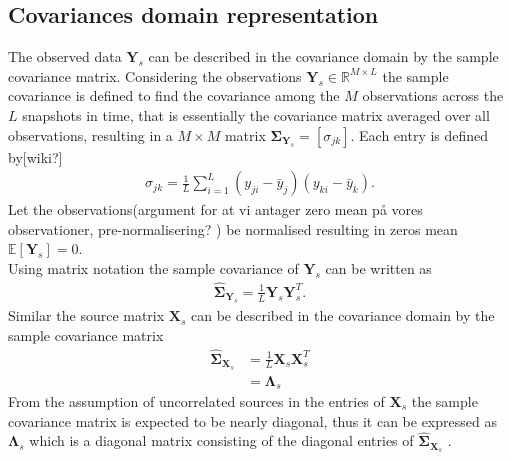 \subsection{Covariances domain representation}
The observed data $\mathbf{Y}_s$ can be described in the covariance domain by the sample covariance matrix. Considering the observations $\mathbf{Y}_s \in \mathbb{R}^{M\times L}$ the sample covariance is defined to find the covariance among the $M$ observations across the $L$ snapshots in time, that is essentially the covariance matrix averaged over all observations, resulting in a $M \times M$ matrix $\boldsymbol{\Sigma}_{\mathbf{Y}_s}=[\sigma_{jk}]$. Each entry is defined by[wiki?] 
\begin{align*}
\sigma_{jk}= \frac{1}{L}\sum_{i=1}^{L}(y_{ji}- \bar{y}_j)(y_{ki}-\bar{y}_k).
\end{align*}
Let the observations(argument for at vi antager zero mean på vores observationer, pre-normalisering? ) be normalised resulting in zeros mean $\mathbb{E}[\mathbf{Y}_s] = 0$. 
\\
Using matrix notation the sample covariance of $\mathbf{Y}_s$ can be written as
\begin{align*}
\hat{\boldsymbol{\Sigma}}_{\mathbf{Y}_s} = \frac{1}{L} \mathbf{Y}_s \mathbf{Y}_s^T.
\end{align*}  
Similar the source matrix $\mathbf{X}_s$ can be described in the covariance domain by the sample covariance matrix
\begin{align*}
\hat{\boldsymbol{\Sigma}}_{\mathbf{X}_s} &= \frac{1}{L} \mathbf{X}_s \mathbf{X}_s^T \\
&= \boldsymbol{\Lambda}_s
\end{align*}
From the assumption of uncorrelated sources in the entries of $\mathbf{X}_s$ the sample covariance matrix is expected to be nearly diagonal, thus it can be expressed as $\boldsymbol{\Lambda}_s$ which is a diagonal matrix consisting of the diagonal entries of $\hat{\boldsymbol{\Sigma}}_{\mathbf{X}_s}$ \cite{Balkan2015}.
